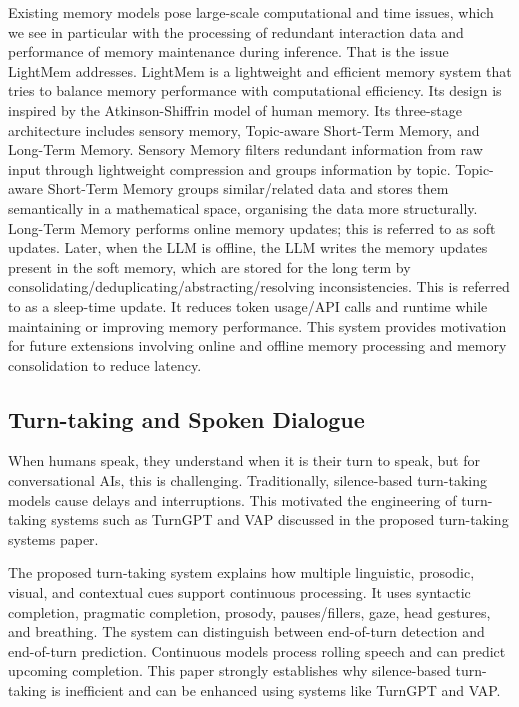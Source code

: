 Existing memory models pose large-scale computational and time issues, which we see in particular with the processing of redundant interaction data and performance of memory maintenance during inference. That is the issue LightMem addresses. LightMem is a lightweight and efficient memory system that tries to balance memory performance with computational efficiency. Its design is inspired by the Atkinson-Shiffrin model of human memory. Its three-stage architecture includes sensory memory, Topic-aware Short-Term Memory, and Long-Term Memory. Sensory Memory filters redundant information from raw input through lightweight compression and groups information by topic. Topic-aware Short-Term Memory groups similar/related data and stores them semantically in a mathematical space, organising the data more structurally. Long-Term Memory performs online memory updates; this is referred to as soft updates. Later, when the LLM is offline, the LLM writes the memory updates present in the soft memory, which are stored for the long term by consolidating/deduplicating/abstracting/resolving inconsistencies. This is referred to as a sleep-time update. It reduces token usage/API calls and runtime while maintaining or improving memory performance. This system provides motivation for future extensions involving online and offline memory processing and memory consolidation to reduce latency. \cite{fang2025lightmem}


\subsection{Turn-taking and Spoken Dialogue}

When humans speak, they understand when it is their turn to speak, but for conversational AIs, this is challenging. Traditionally, silence-based turn-taking models cause delays and interruptions. This motivated the engineering of turn-taking systems such as TurnGPT and VAP discussed in the proposed turn-taking systems paper. \cite{skantze2021turntaking}

The proposed turn-taking system explains how multiple linguistic, prosodic, visual, and contextual cues support continuous processing. It uses syntactic completion, pragmatic completion, prosody, pauses/fillers, gaze, head gestures, and breathing. The system can distinguish between end-of-turn detection and end-of-turn prediction. Continuous models process rolling speech and can predict upcoming completion. This paper strongly establishes why silence-based turn-taking is inefficient and can be enhanced using systems like TurnGPT and VAP. \cite{skantze2021turntaking}

